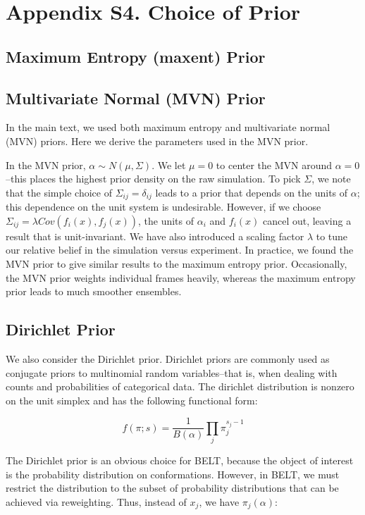 \documentclass[journal=jacsat,manuscript=article]{achemso}
\begin{document}
\newpage

\section{Appendix S4.  Choice of Prior}

\subsection{Maximum Entropy (maxent) Prior}

\subsection{Multivariate Normal (MVN) Prior}

In the main text, we used both maximum entropy and multivariate normal (MVN) priors.  Here we derive the parameters used in the MVN prior. 

In the MVN prior, $\alpha \sim N(\mu,\Sigma)$.  We let $\mu = 0$ to center the MVN around $\alpha = 0$--this places the highest prior density on the raw simulation.  To pick $\Sigma$, we note that the simple choice of $\Sigma_{ij} = \delta_{ij}$ leads to a prior that depends on the units of $\alpha$; this dependence on the unit system is undesirable.  However, if we choose $\Sigma_{ij} = \lambda Cov(f_i(x), f_j(x))$, the units of $\alpha_i$ and $f_i(x)$ cancel out, leaving a result that is unit-invariant.  We have also introduced a scaling factor $\lambda$ to tune our relative belief in the simulation versus experiment.  In practice, we found the MVN prior to give similar results to the maximum entropy prior.  Occasionally, the MVN prior weights individual frames heavily, whereas the maximum entropy prior leads to much smoother ensembles.  

\subsection{Dirichlet Prior}

We also consider the Dirichlet prior.  Dirichlet priors are commonly used as conjugate priors to multinomial random variables--that is, when dealing with counts and probabilities of categorical data.  The dirichlet distribution is nonzero on the unit simplex and has the following functional form:

$$f(\pi;s) = \frac{1}{B(\alpha)} \prod_j \pi_j^{s_j - 1}$$

The Dirichlet prior is an obvious choice for BELT, because the object of interest is the probability distribution on conformations.  However, in BELT, we must restrict the distribution to the subset of probability distributions that can be achieved via reweighting.  Thus, instead of $x_j$, we have $\pi_j(\alpha)$:
\end{document}
